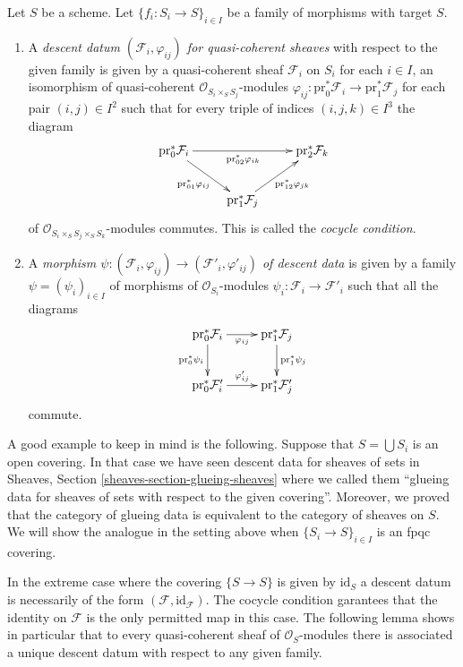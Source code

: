 \begin{definition}
\label{definition-descent-datum-quasi-coherent}
Let $S$ be a scheme. Let $\{f_i : S_i \to S\}_{i \in I}$ be a family
of morphisms with target $S$.
\begin{enumerate}
\item A {\it descent datum $(\mathcal{F}_i, \varphi_{ij})$
for quasi-coherent sheaves} with respect to the given family
is given by a quasi-coherent sheaf $\mathcal{F}_i$ on $S_i$ for
each $i \in I$, an isomorphism of quasi-coherent
$\mathcal{O}_{S_i \times_S S_j}$-modules
$\varphi_{ij} : \text{pr}_0^*\mathcal{F}_i \to \text{pr}_1^*\mathcal{F}_j$
for each pair $(i, j) \in I^2$
such that for every triple of indices $(i, j, k) \in I^3$ the
diagram
$$
\xymatrix{
\text{pr}_0^*\mathcal{F}_i \ar[rd]_{\text{pr}_{01}^*\varphi_{ij}}
\ar[rr]_{\text{pr}_{02}^*\varphi_{ik}} & &
\text{pr}_2^*\mathcal{F}_k \\
& \text{pr}_1^*\mathcal{F}_j \ar[ru]_{\text{pr}_{12}^*\varphi_{jk}} &
}
$$
of $\mathcal{O}_{S_i \times_S S_j \times_S S_k}$-modules
commutes. This is called the {\it cocycle condition}.
\item A {\it morphism $\psi : (\mathcal{F}_i, \varphi_{ij}) \to
(\mathcal{F}'_i, \varphi'_{ij})$ of descent data} is given
by a family $\psi = (\psi_i)_{i\in I}$ of morphisms of
$\mathcal{O}_{S_i}$-modules $\psi_i : \mathcal{F}_i \to \mathcal{F}'_i$
such that all the diagrams
$$
\xymatrix{
\text{pr}_0^*\mathcal{F}_i \ar[r]_{\varphi_{ij}} \ar[d]_{\text{pr}_0^*\psi_i}
& \text{pr}_1^*\mathcal{F}_j \ar[d]^{\text{pr}_1^*\psi_j} \\
\text{pr}_0^*\mathcal{F}'_i \ar[r]^{\varphi'_{ij}} &
\text{pr}_1^*\mathcal{F}'_j \\
}
$$
commute.
\end{enumerate}
\end{definition}

\noindent
A good example to keep in mind is the following.
Suppose that $S = \bigcup S_i$ is an open covering.
In that case we have seen descent data for sheaves of sets in
Sheaves, Section \ref{sheaves-section-glueing-sheaves}
where we called them ``glueing data for sheaves of sets
with respect to the given covering''. Moreover, we proved
that the category of glueing data is equivalent to the category
of sheaves on $S$. We will show the analogue in the setting above when
$\{S_i \to S\}_{i\in I}$ is an fpqc covering.

\medskip\noindent
In the extreme case where the covering $\{S \to S\}$
is given by $\text{id}_S$ a descent datum is necessarily
of the form $(\mathcal{F}, \text{id}_{\mathcal{F}})$. The cocycle
condition garantees that the identity on $\mathcal{F}$ is the
only permitted map in this case. The following lemma shows
in particular that to every quasi-coherent sheaf of
$\mathcal{O}_S$-modules there is associated a unique
descent datum with respect to any given family.

